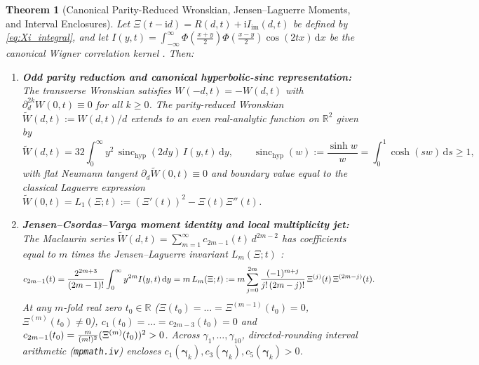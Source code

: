 \documentclass[11pt,a4paper,reqno]{amsart}
\newtheorem{theorem}{Theorem}[section]
\theoremstyle{definition}
\theoremstyle{remark}
\numberwithin{equation}{section}
\newcommand{\dd}{\mathrm{d}}
\newcommand{\ii}{\mathrm{i}}
\newcommand{\Wtil}{\widetilde{W}}
\newcommand{\sinch}{\operatorname{sinc}_{\mathrm{hyp}}}
\newcommand{\fac}{\mathclose{\mathchar"0021}}
\begin{document}
\begin{theorem}[Canonical Parity-Reduced Wronskian, Jensen--Laguerre Moments, and Interval Enclosures]\label{thm:main}
Let $\Xi(t-\ii d) = R(d,t) + \ii I_{\mathrm{im}}(d,t)$ be defined by \eqref{eq:Xi_integral}, and let $I(y,t) = \int_{-\infty}^\infty \Phi(\frac{x+y}{2})\Phi(\frac{x-y}{2})\cos(2t x)\,\dd x$ be the canonical Wigner correlation kernel \cite{Missiaen2026Paper1}. Then:
\begin{enumerate}
\item[\textup{(i)}] \textbf{Odd parity reduction and canonical hyperbolic-sinc representation:} The transverse Wronskian satisfies $W(-d,t) = -W(d,t)$ with $\partial_d^{2k}W(0,t) \equiv 0$ for all $k \ge 0$. The parity-reduced Wronskian $\Wtil(d,t) := W(d,t)/d$ extends to an even real-analytic function on $\mathbb{R}^2$ given by
\begin{equation}\label{eq:W_tilde_thm}
\Wtil(d,t) = 32\int_0^\infty y^2\,\sinch(2d y)\,I(y,t)\,\dd y, \qquad \sinch(w) := \frac{\sinh w}{w} = \int_0^1 \cosh(s w)\,\dd s \ge 1,
\end{equation}
with flat Neumann tangent $\partial_d\Wtil(0,t) \equiv 0$ and boundary value equal to the classical Laguerre expression $\Wtil(0,t) = L_1(\Xi;t) := (\Xi'(t))^2 - \Xi(t)\Xi''(t)$.
\item[\textup{(ii)}] \textbf{Jensen--Csordas--Varga moment identity and local multiplicity jet:} The Maclaurin series $\Wtil(d,t) = \sum_{m=1}^\infty c_{2m-1}(t)\,d^{2m-2}$ has coefficients equal to $m$ times the Jensen--Laguerre invariant $L_m(\Xi;t)$ \cite{Jensen1913,CsordasVarga1990}:
\begin{equation}\label{eq:c_2m_thm}
c_{2m-1}(t) = \frac{2^{2m+3}}{(2m-1)\fac}\int_0^\infty y^{2m}I(y,t)\,\dd y = m\,L_m(\Xi;t) := m\sum_{j=0}^{2m}\frac{(-1)^{m+j}}{j\fac\,(2m-j)\fac}\,\Xi^{(j)}(t)\,\Xi^{(2m-j)}(t).
\end{equation}
At any $m$-fold real zero $t_0 \in \mathbb{R}$ ($\Xi(t_0) = \dots = \Xi^{(m-1)}(t_0) = 0$, $\Xi^{(m)}(t_0) \neq 0$), $c_1(t_0) = \dots = c_{2m-3}(t_0) = 0$ and $c_{2m-1}(t_0) = \frac{m}{(m\fac)^2}(\Xi^{(m)}(t_0))^2 > 0$. Across $\gamma_1, \dots, \gamma_{10}$, directed-rounding interval arithmetic (\texttt{mpmath.iv}) encloses $c_1(\boldsymbol{\gamma}_k), c_3(\boldsymbol{\gamma}_k), c_5(\boldsymbol{\gamma}_k) > 0$.

\end{enumerate}
\end{theorem}
\end{document}
